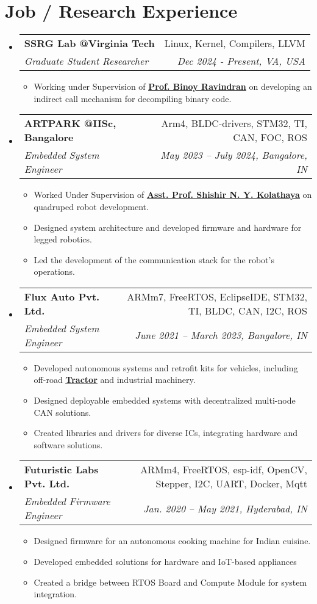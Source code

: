 \documentclass[letterpaper,11pt]{article}
\makeatletter
\newcommand{\resumeItem}[1]{
  \item\small{
    {#1 \vspace{-2pt}}
  }
}
\newcommand{\resumeSubheading}[4]{
  \vspace{-2pt}\item
    \begin{tabular*}{0.97\textwidth}[t]{l@{\extracolsep{\fill}}r}
      \textbf{#1} & #2 \\
      \textit{\small#3} & \textit{\small #4} \\
    \end{tabular*}\vspace{-9pt}
}
\newcommand{\resumeSubSubheading}[2]{
    \item
    \begin{tabular*}{0.97\textwidth}{l@{\extracolsep{\fill}}r}
      \textit{\small#1} & \textit{\small #2} \\
    \end{tabular*}\vspace{-10pt}
}
\newcommand{\resumeSubHeadingListStart}{\begin{itemize}[leftmargin=0.15in, label={}]}
\newcommand{\resumeSubHeadingListEnd}{\end{itemize}}
\newcommand{\resumeItemListStart}{\begin{itemize}}
\newcommand{\resumeItemListEnd}{\end{itemize}\vspace{-9pt}}
\makeatother
\begin{document}
\section{Job / Research Experience}
  
\resumeSubHeadingListStart
    \resumeSubheading
      {SSRG Lab @Virginia Tech}{Linux, Kernel, Compilers, LLVM}
      {Graduate Student Researcher}{Dec 2024 - Present, VA, USA}
      \resumeItemListStart
        \resumeItem{Working under Supervision of \underline{\textbf{\href{https://binoyravindran.github.io/about/about/}{Prof. Binoy Ravindran}}} on developing an indirect call mechanism for decompiling binary code.}
      \resumeItemListEnd

    \resumeSubheading
    {ARTPARK @IISc, Bangalore}{Arm4, BLDC-drivers, STM32, TI, CAN, FOC, ROS}
    {Embedded System Engineer}{May 2023 -- July 2024, Bangalore, IN}
    \resumeItemListStart
      \resumeItem{Worked Under Supervision of \underline{\textbf{\href{https://eecs.iisc.ac.in/people/shishir-kolathaya/}{Asst. Prof. Shishir N. Y. Kolathaya}}} on quadruped robot development.} 
      \resumeItem{Designed system architecture and developed firmware and hardware for legged robotics.}
      \resumeItem{Led the development of the communication stack for the robot's operations.}
    \resumeItemListEnd

    \resumeSubheading
    {Flux Auto Pvt. Ltd.}{ARMm7, FreeRTOS, EclipseIDE, STM32, TI, BLDC, CAN, I2C, ROS}
    {Embedded System Engineer}{June 2021 -- March 2023, Bangalore, IN}
    \resumeItemListStart
      \resumeItem{Developed autonomous systems and retrofit kits for vehicles, including off-road \underline{\textbf{\href{https://youtu.be/TS1C2sPgFIc}{Tractor}}} and industrial machinery.}
      \resumeItem{Designed deployable embedded systems with decentralized multi-node CAN solutions.}
      \resumeItem{Created libraries and drivers for diverse ICs, integrating hardware and software solutions.}
    \resumeItemListEnd
    
    \resumeSubheading
      {Futuristic Labs Pvt. Ltd.}{ARMm4, FreeRTOS, esp-idf, OpenCV, Stepper, I2C, UART, Docker, Mqtt}
      {Embedded Firmware Engineer}{Jan. 2020 -- May 2021, Hyderabad, IN}
      \resumeItemListStart
        \resumeItem{Designed firmware for an autonomous cooking machine for Indian cuisine.}
        \resumeItem{Developed embedded solutions for hardware and IoT-based appliances}
        \resumeItem{Created a bridge between RTOS Board and Compute Module for system integration.}
      \resumeItemListEnd
  \resumeSubHeadingListEnd    
\end{document}
